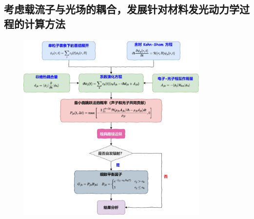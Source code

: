 \subsection{考虑载流子与光场的耦合，发展针对材料发光动力学过程的计算方法}

  \begin{figure}
    \centering
    \captionsetup{width=0.85\textwidth}
    \includegraphics[width=0.85\textwidth]{figs/namd_emission_flowchart.pdf}
 \end{figure}


